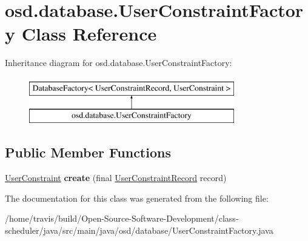 \hypertarget{classosd_1_1database_1_1_user_constraint_factory}{\section{osd.\-database.\-User\-Constraint\-Factory Class Reference}
\label{classosd_1_1database_1_1_user_constraint_factory}
}
Inheritance diagram for osd.\-database.\-User\-Constraint\-Factory\-:\begin{figure}[H]
\begin{center}
\leavevmode
\includegraphics[height=2.000000cm]{classosd_1_1database_1_1_user_constraint_factory}
\end{center}
\end{figure}
\subsection*{Public Member Functions}
\begin{DoxyCompactItemize}
\item 
\hypertarget{classosd_1_1database_1_1_user_constraint_factory_a18370b0280bac769da6e4498b3a22a8d}{\hyperlink{classosd_1_1considerations_1_1_user_constraint}{User\-Constraint} {\bfseries create} (final \hyperlink{classosd_1_1database_1_1_user_constraint_record}{User\-Constraint\-Record} record)}\label{classosd_1_1database_1_1_user_constraint_factory_a18370b0280bac769da6e4498b3a22a8d}

\end{DoxyCompactItemize}


The documentation for this class was generated from the following file\-:\begin{DoxyCompactItemize}
\item 
/home/travis/build/\-Open-\/\-Source-\/\-Software-\/\-Development/class-\/scheduler/java/src/main/java/osd/database/User\-Constraint\-Factory.\-java\end{DoxyCompactItemize}
